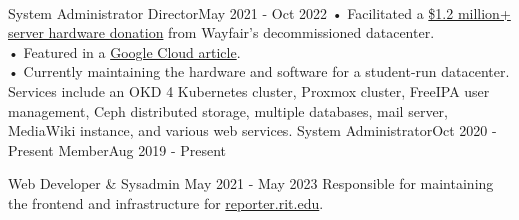 \vspace{1.5pt} %


\cvtag{\LaTeX}
\medskip
\\

\vspace{6pt} %

    {System Administrator Director}{May 2021 - Oct 2022}
    {•  Facilitated a \href{https://www.rit.edu/news/wayfair-gifts-850000-servers-rits-computer-science-house}{\$1.2 million+ server hardware donation} from Wayfair's decommissioned datacenter.\\ \smallskip
    •  Featured in a \href{https://cloud.google.com/blog/transform/wayfair-server-donation-mass-open-cloud-rit-student-innovation-johonnot}{Google Cloud article}.\\ \smallskip
    •  Currently maintaining the hardware and software for a student-run datacenter. Services include an OKD 4 Kubernetes cluster, Proxmox cluster, FreeIPA user management, Ceph distributed storage, multiple databases, mail server, MediaWiki instance, and various web services.} 
    {System Administrator}{Oct 2020 - Present}
    {Member}{Aug 2019 - Present}

    {Web Developer \& Sysadmin} {May 2021 - May 2023}
    {Responsible for maintaining the frontend and infrastructure for \href{https://reporter.rit.edu}{reporter.rit.edu}.}
